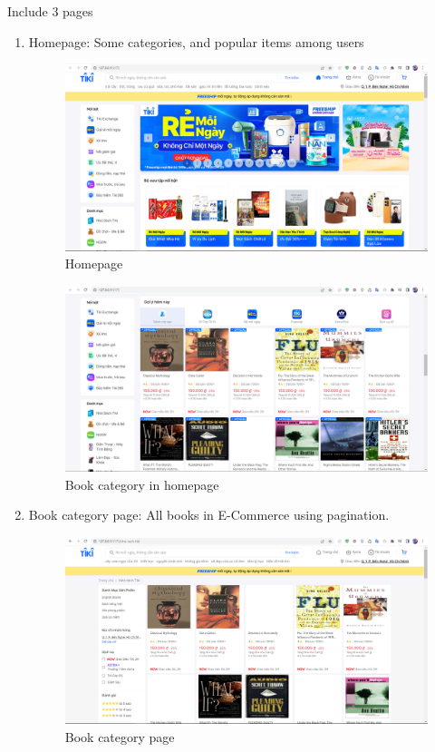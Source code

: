 Include 3 pages
\begin{enumerate}
    \item Homepage: Some categories, and popular items among users
    \begin{figure}[H]
            \centering
            \includegraphics[width=\textwidth]{image/homepage.jpg}
            \caption{Homepage}
        \end{figure}

    \begin{figure}[H]
            \centering
            \includegraphics[width=\textwidth]{image/homepage2.jpg}
            \caption{Book category in homepage}
        \end{figure}

    \item Book category page: All books in E-Commerce using pagination.
    \begin{figure}[H]
            \centering
            \includegraphics[width=\textwidth]{image/book category.jpg}
            \caption{Book category page}
        \end{figure}


\end{enumerate}
